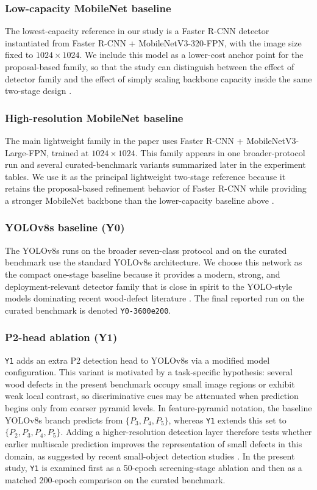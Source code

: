 \documentclass[journal,article,submit,moreauthors,pdftex]{Definitions/tsp}
\begin{document}
\subsubsection{Low-capacity MobileNet baseline}
The lowest-capacity reference in our study is a Faster R-CNN detector instantiated from Faster R-CNN + MobileNetV3-320-FPN,  with the image size fixed to $1024 \times 1024$. We include this model as a lower-cost anchor point for the proposal-based family, so that the study can distinguish between the effect of detector family and the effect of simply scaling backbone capacity inside the same two-stage design \citep{faster_rcnn,mobilenetv3}.

\subsubsection{High-resolution MobileNet baseline}
The main lightweight family in the paper uses Faster R-CNN + MobileNetV3-Large-FPN, trained at $1024 \times 1024$. This family appears in one broader-protocol run and several curated-benchmark variants summarized later in the experiment tables. We use it as the principal lightweight two-stage reference because it retains the proposal-based refinement behavior of Faster R-CNN while providing a stronger MobileNet backbone than the lower-capacity baseline above \citep{faster_rcnn,mobilenetv3}.

\subsubsection{YOLOv8s baseline (Y0)}
The YOLOv8s runs on the broader seven-class protocol and on the curated benchmark use the standard YOLOv8s architecture. We choose this network as the compact one-stage baseline because it provides a modern, strong, and deployment-relevant detector family that is close in spirit to the YOLO-style models dominating recent wood-defect literature \citep{odca_yolo,bpn_yolo,sim_yolo,fdd_yolo}. The final reported run on the curated benchmark is denoted \texttt{Y0-3600e200}.

\subsubsection{P2-head ablation (Y1)}
\texttt{Y1} adds an extra P2 detection head to YOLOv8s via a modified model configuration. This variant is motivated by a task-specific hypothesis: several wood defects in the present benchmark occupy small image regions or exhibit weak local contrast, so discriminative cues may be attenuated when prediction begins only from coarser pyramid levels. In feature-pyramid notation, the baseline YOLOv8s branch predicts from $\{P_3, P_4, P_5\}$, whereas \texttt{Y1} extends this set to $\{P_2, P_3, P_4, P_5\}$. Adding a higher-resolution detection layer therefore tests whether earlier multiscale prediction improves the representation of small defects in this domain, as suggested by recent small-object detection studies \citep{wei_2024_smallreview,hua_2025_smallsurvey,cmc_insulator_small}. In the present study, \texttt{Y1} is examined first as a 50-epoch screening-stage ablation and then as a matched 200-epoch comparison on the curated benchmark.
\end{document}
